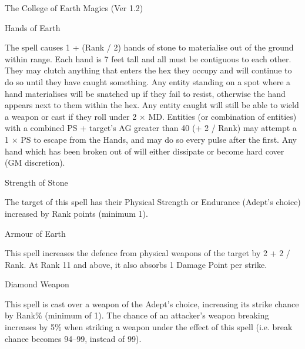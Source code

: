 \begin{Chapter}{The College of Earth Magics (Ver 1.2)}
\begin{spell}[S-2]{Hands of Earth}
\begin{effects}
The spell causes 1 + (Rank / 2) hands of stone to materialise out of
the ground within range.  Each hand is 7 feet tall and all must be
contiguous to each other. They may clutch anything that enters the hex
they occupy and will continue to do so until they have caught
something.  Any entity standing on a spot where a hand materialises
will be snatched up if they fail to resist, otherwise the hand appears
next to them within the hex.  Any entity caught will still be able to
wield a weapon or cast if they roll under 2 × MD. Entities (or
combination of entities) with a combined PS + target’s AG greater than
40 (+ 2 / Rank) may attempt a 1 × PS to escape from the Hands, and may
do so every pulse after the first.  Any hand which has been broken out
of will either dissipate or become hard cover (GM discretion).
\end{effects}
\end{spell}

\begin{spell}[S-3]{Strength of Stone}

\begin{effects}
The target of this spell has their Physical Strength or Endurance
(Adept’s choice) increased by Rank points (minimum 1).
\end{effects}
\end{spell}

\begin{spell}[S-4]{Armour of Earth}

\begin{effects}
This spell increases the defence from physical weapons of the target
by 2 + 2 / Rank.  At Rank 11 and above, it also absorbs 1 Damage Point
per strike.

\end{effects}
\end{spell}

\begin{spell}[S-5]{Diamond Weapon}

\begin{effects}
This spell is cast over a weapon of the Adept’s choice, increasing its
strike chance by Rank\% (minimum of 1).  The chance of an attacker’s
weapon breaking increases by 5\% when striking a weapon under the
effect of this spell (i.e.  break chance becomes 94–99, instead of
99).
\end{effects}
\end{spell}


\end{Chapter}

